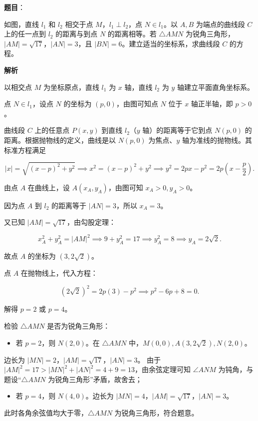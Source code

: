 \begin{answer}

\textbf{题目}：

如图，直线 $l_1$ 和 $l_2$ 相交于点 $M$，$l_1\perp l_2$，点 $N\in l_1$。以 $A,B$ 为端点的曲线段 $C$ 上的任一点到 $l_2$ 的距离与到点 $N$ 的距离相等。若 $\triangle AMN$ 为锐角三角形，$|AM|=\sqrt{17}$，$|AN|=3$，且 $|BN|=6$。建立适当的坐标系，求曲线段 $C$ 的方程。
\nopagebreak[4]
\begin{center}\end{center}
\nopagebreak[4]
\textbf{解析}

以相交点 $M$ 为坐标原点，直线 $l_1$ 为 $x$ 轴，直线 $l_2$ 为 $y$ 轴建立平面直角坐标系。

点 $N \in l_1$，设点 $N$ 的坐标为 $(p, 0)$，由图可知点 $N$ 位于 $x$ 轴正半轴，即 $p>0$。

曲线段 $C$ 上的任意点 $P(x, y)$ 到直线 $l_2$（$y$ 轴）的距离等于它到点 $N(p, 0)$ 的距离。根据抛物线的定义，曲线是以 $N(p,0)$ 为焦点、$y$ 轴为准线的抛物线。其标准方程满足

\nopagebreak[4]
\[
|x| = \sqrt{(x-p)^2 + y^2} \implies x^2 = (x-p)^2 + y^2 \implies y^2 = 2px - p^2 = 2p\left(x - \frac{p}{2}\right).
\]

由点 $A$ 在曲线上，设 $A(x_A, y_A)$，由图可知 $x_A>0, y_A>0$。

因为点 $A$ 到 $l_2$ 的距离等于 $|AN|=3$，所以 $x_A = 3$。

又已知 $|AM| = \sqrt{17}$，由勾股定理：

\nopagebreak[4]
\[
x_A^2 + y_A^2 = |AM|^2 \implies 9 + y_A^2 = 17 \implies y_A^2 = 8 \implies y_A = 2\sqrt2.
\]

故点 $A$ 的坐标为 $(3, 2\sqrt2)$。

点 $A$ 在抛物线上，代入方程：

\nopagebreak[4]
\[
(2\sqrt2)^2 = 2p(3) - p^2 \implies p^2 - 6p + 8 = 0.
\]

解得 $p=2$ 或 $p=4$。

检验 $\triangle AMN$ 是否为锐角三角形：

\begin{itemize}
\item 若 $p=2$，则 $N(2,0)$。在 $\triangle AMN$ 中，$M(0,0), A(3,2\sqrt2), N(2,0)$。
\end{itemize}
  边长为 $|MN|=2$，$|AM|=\sqrt{17}$，$|AN|=3$。
  由于 $|AM|^2 = 17 > |MN|^2 + |AN|^2 = 4 + 9 = 13$，由余弦定理可知 $\angle ANM$ 为钝角，与题设“$\triangle AMN$ 为锐角三角形”矛盾，故舍去；
\begin{itemize}
\item 若 $p=4$，则 $N(4,0)$。边长为 $|MN|=4$，$|AM|=\sqrt{17}$，$|AN|=3$。
\end{itemize}
  此时各角余弦值均大于零，$\triangle AMN$ 为锐角三角形，符合题意。


\end{answer}
